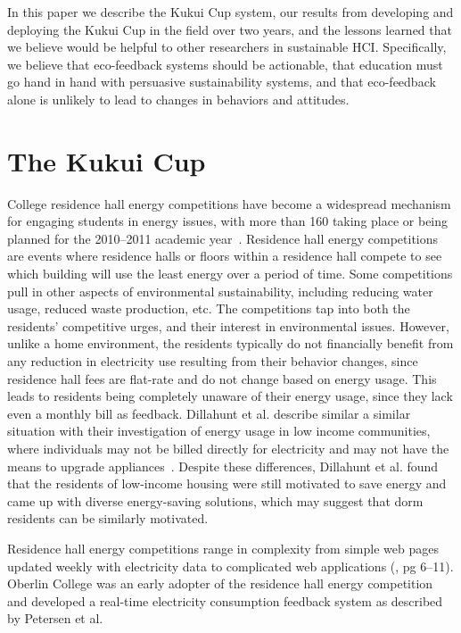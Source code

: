 \documentclass{sigchi}
\begin{document}
In this paper we describe the Kukui Cup system, our results from developing and deploying the Kukui Cup in the field over two years, and the lessons learned that we believe would be helpful to other researchers in sustainable HCI. Specifically, we believe that eco-feedback systems should be actionable, that education must go hand in hand with persuasive sustainability systems, and that eco-feedback alone is unlikely to lead to changes in behaviors and attitudes.

\section{The Kukui Cup}

College residence hall energy competitions have become a widespread mechanism for engaging students in energy issues, with more than 160 taking place or being planned for the 2010--2011 academic year~\cite{Hodge2010}. Residence hall energy competitions are events where residence halls or floors within a residence hall compete to see which building will use the least energy over a period of time. Some competitions pull in other aspects of environmental sustainability, including reducing water usage, reduced waste production, etc. The competitions tap into both the residents' competitive urges, and their interest in environmental issues. However, unlike a home environment, the residents typically do not financially benefit from any reduction in electricity use resulting from their behavior changes, since residence hall fees are flat-rate and do not change based on energy usage. This leads to residents being completely unaware of their energy usage, since they lack even a monthly bill as feedback. Dillahunt et al. describe similar a similar situation with their investigation of energy usage in low income communities, where individuals may not be billed directly for electricity and may not have the means to upgrade appliances~\cite{Dillahunt2009-low-income}. Despite these differences, Dillahunt et al. found that the residents of low-income housing were still motivated to save energy and came up with diverse energy-saving solutions, which may suggest that dorm residents can be similarly motivated.

Residence hall energy competitions range in complexity from simple web pages updated weekly with electricity data to complicated web applications (\cite{csdl2-11-01}, pg 6--11). Oberlin College was an early adopter of the residence hall energy competition and developed a real-time electricity consumption feedback system as described by Petersen et al.~\cite{petersen-dorm-energy-reduction}
\end{document}
